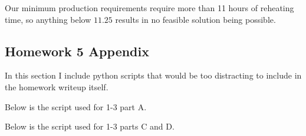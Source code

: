 Our minimum production requirements require more than 11 hours of reheating time, so anything below $11.25$ results in no feasible solution being possible. 

\pagebreak
\subsection*{Homework 5 Appendix}

In this section I include python scripts that would be too distracting to include in the homework writeup itself.

Below is the script used for 1-3 part A.



Below is the script used for 1-3 parts C and D.


